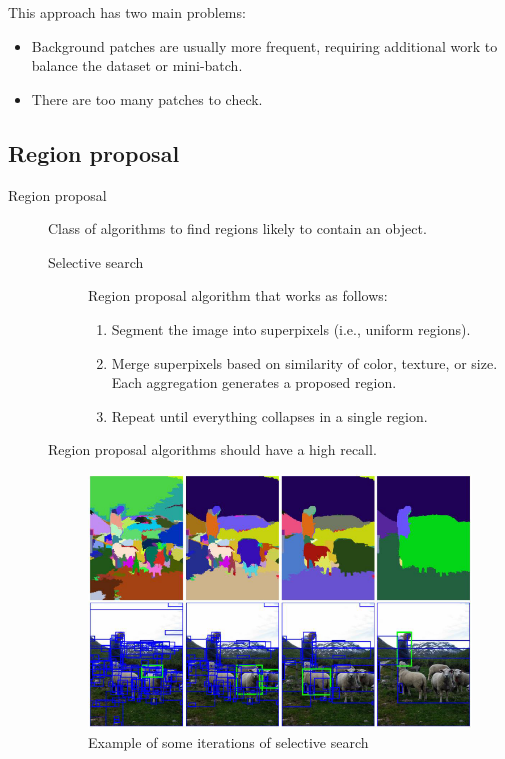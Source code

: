 \begin{description}
\begin{remark}
            This approach has two main problems:
            \begin{itemize}
                \item Background patches are usually more frequent, requiring additional work to balance the dataset or mini-batch.
                \item There are too many patches to check.
            \end{itemize}
        \end{remark}
\end{description}


\subsection{Region proposal}

\begin{description}
    \item[Region proposal] 
        Class of algorithms to find regions likely to contain an object.

        \begin{description}
            \item[Selective search] 
            Region proposal algorithm that works as follows:
            \begin{enumerate}
                \item Segment the image into superpixels (i.e., uniform regions).
                \item Merge superpixels based on similarity of color, texture, or size. Each aggregation generates a proposed region.
                \item Repeat until everything collapses in a single region.
            \end{enumerate}
        \end{description}

        \begin{remark}
            Region proposal algorithms should have a high recall.
        \end{remark}

        \begin{figure}[H]
            \centering
            \includegraphics[width=0.45\linewidth]{./img/selective_search.png}
            \caption{Example of some iterations of selective search}
        \end{figure}


\end{description}
